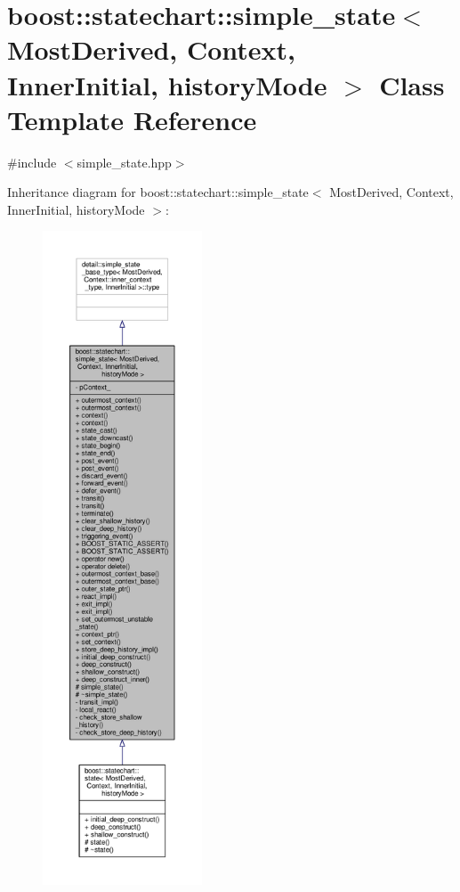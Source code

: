 \hypertarget{classboost_1_1statechart_1_1simple__state}{}\section{boost\+:\+:statechart\+:\+:simple\+\_\+state$<$ Most\+Derived, Context, Inner\+Initial, history\+Mode $>$ Class Template Reference}
\label{classboost_1_1statechart_1_1simple__state}


{\ttfamily \#include $<$simple\+\_\+state.\+hpp$>$}



Inheritance diagram for boost\+:\+:statechart\+:\+:simple\+\_\+state$<$ Most\+Derived, Context, Inner\+Initial, history\+Mode $>$\+:
\nopagebreak
\begin{figure}[H]
\begin{center}
\leavevmode
\includegraphics[height=550pt]{classboost_1_1statechart_1_1simple__state__inherit__graph}
\end{center}
\end{figure}



